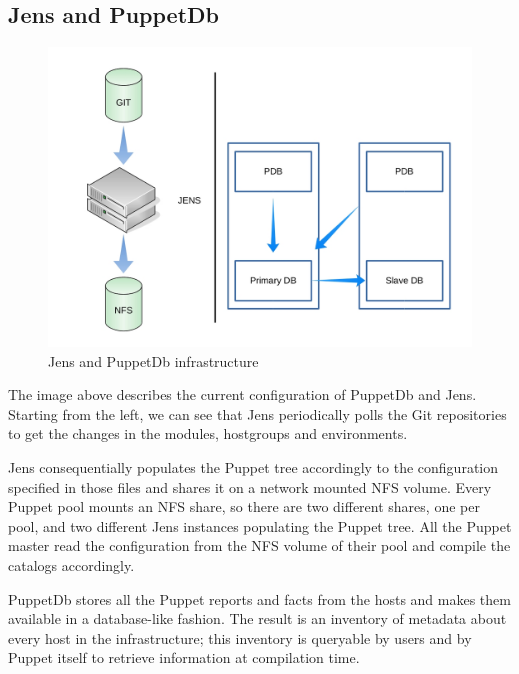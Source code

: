 \subsection{Jens and PuppetDb}

\begin{figure}[H]
\includegraphics[width=\textwidth,height=\textheight,keepaspectratio]{ConfigurationManagement/Infrastructure_jens_pdb.jpg}
\caption{Jens and PuppetDb infrastructure}
\end{figure}

The image above describes the current configuration of PuppetDb and Jens.
Starting from the left, we can see that Jens periodically polls the Git
repositories to get the changes in the modules, hostgroups and
environments.

Jens consequentially populates the Puppet tree accordingly to the
configuration specified in those files and shares it on a network mounted
NFS volume. Every Puppet pool mounts an NFS share, so there are two
different shares, one per pool, and two different Jens instances
populating the Puppet tree. All the Puppet master read the configuration
from the NFS volume of their pool and compile the catalogs accordingly.

PuppetDb stores all the Puppet reports and facts from the hosts and makes
them available in a database-like fashion. The result is an inventory of
metadata about every host in the infrastructure; this inventory is
queryable by users and by Puppet itself to retrieve information at
compilation time.
